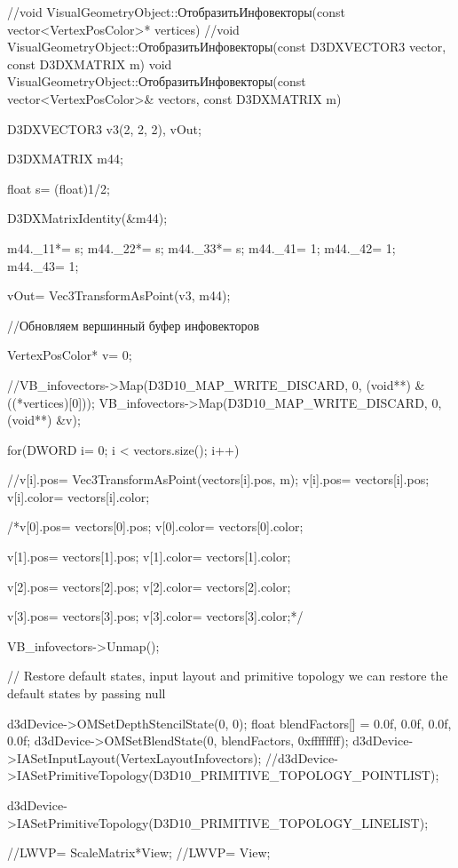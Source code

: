 //void VisualGeometryObject::ОтобразитьИнфовекторы(const vector<VertexPosColor>* vertices)
//void VisualGeometryObject::ОтобразитьИнфовекторы(const D3DXVECTOR3 vector, const D3DXMATRIX m)
void VisualGeometryObject::ОтобразитьИнфовекторы(const vector<VertexPosColor>& vectors, const D3DXMATRIX m)
{

	
	D3DXVECTOR3 v3(2, 2, 2), vOut;

	D3DXMATRIX m44;

	float s= (float)1/2;

	D3DXMatrixIdentity(&m44);

	m44._11*= s;	m44._22*= s;	m44._33*= s;
	m44._41= 1;		m44._42= 1;		m44._43= 1;


	vOut= Vec3TransformAsPoint(v3, m44);
	
	
	//Обновляем вершинный буфер инфовекторов

		VertexPosColor* v= 0;

		


	//VB_infovectors->Map(D3D10_MAP_WRITE_DISCARD, 0, (void**) &((*vertices)[0]));
	VB_infovectors->Map(D3D10_MAP_WRITE_DISCARD, 0, (void**) &v);

	
		for(DWORD i= 0; i < vectors.size(); i++)
		{
		
			//v[i].pos= Vec3TransformAsPoint(vectors[i].pos, m);
			v[i].pos= vectors[i].pos;
			v[i].color= vectors[i].color;
		
		}

		/*v[0].pos= vectors[0].pos;
		v[0].color= vectors[0].color;

		v[1].pos= vectors[1].pos;
		v[1].color= vectors[1].color;

		v[2].pos= vectors[2].pos;
		v[2].color= vectors[2].color;
		
		v[3].pos= vectors[3].pos;
		v[3].color= vectors[3].color;*/


	VB_infovectors->Unmap();
	
	
	// Restore default states, input layout and primitive topology we can restore the default states by passing null

	d3dDevice->OMSetDepthStencilState(0, 0);
	float blendFactors[] = {0.0f, 0.0f, 0.0f, 0.0f};
	d3dDevice->OMSetBlendState(0, blendFactors, 0xffffffff);
	d3dDevice->IASetInputLayout(VertexLayoutInfovectors);
	//d3dDevice->IASetPrimitiveTopology(D3D10_PRIMITIVE_TOPOLOGY_POINTLIST);

	d3dDevice->IASetPrimitiveTopology(D3D10_PRIMITIVE_TOPOLOGY_LINELIST);


	//LWVP= ScaleMatrix*View;
	//LWVP= View;

}
